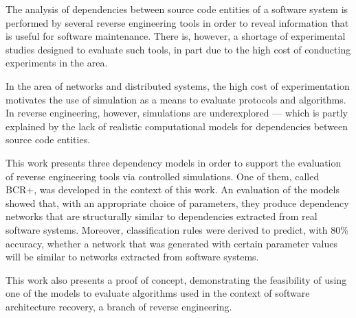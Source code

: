 
The analysis of dependencies between source code entities of a software system is performed by several reverse engineering tools in order to reveal information that is useful for software maintenance. There is, however, a shortage of experimental studies designed to evaluate such tools, in part due to the high cost of conducting experiments in the area.

In the area of networks and distributed systems, the high cost of experimentation motivates the use of simulation as a means to evaluate protocols and algorithms. In reverse engineering, however, simulations are underexplored --- which is partly explained by the lack of realistic computational models for dependencies between source code entities.

This work presents three dependency models in order to support the evaluation of reverse engineering tools via controlled simulations. One of them, called BCR+, was developed in the context of this work. An evaluation of the models showed that, with an appropriate choice of parameters, they produce dependency networks that are structurally similar to dependencies extracted from real software systems. Moreover, classification rules were derived to predict, with 80\% accuracy, whether a network that was generated with certain parameter values will be similar to networks extracted from software systems.

This work also presents a proof of concept, demonstrating the feasibility of using one of the models to evaluate algorithms used in the context of software architecture recovery, a branch of reverse engineering.
